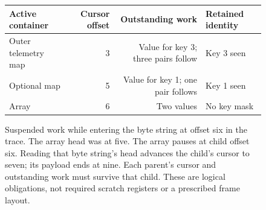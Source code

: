 \begin{figure}[htbp]
  \centering
  \begin{tabular}{l r r l}
    \toprule
    Active container    & Cursor offset & Outstanding work                    & Retained identity \\
    \midrule
    Outer telemetry map & 3             & Value for key 3; three pairs follow & Key 3 seen        \\
    Optional map        & 5             & Value for key 1; one pair follows   & Key 1 seen        \\
    Array               & 6             & Two values                          & No key mask       \\
    \bottomrule
  \end{tabular}
  \caption{Suspended work while entering the byte string at offset six in the trace. The array head was at five. The array pauses at child offset six. Reading that byte string's head advances the child's cursor to seven; its payload ends at nine. Each parent's cursor and outstanding work must survive that child. These are logical obligations, not required scratch registers or a prescribed frame layout.}
  \label{fig:revision-cbor-parent-state}
\end{figure}
